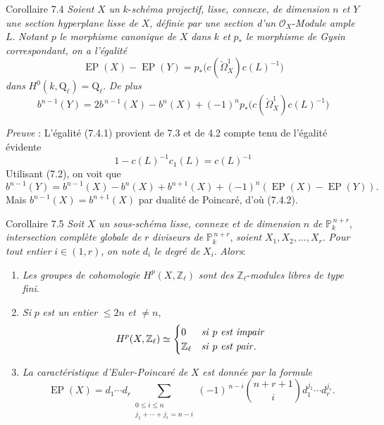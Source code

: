 \begin{statement}{Corollaire 7.4}
\emph{Soient} $X$ \emph{un} $k$-\emph{schéma projectif, lisse, connexe, de dimension} $n$ \emph{et} $Y$ \emph{une section hyperplane lisse de} $X$, \emph{définie par une section d'un} $\mathcal{O}_X$-\emph{Module ample} $L$. \emph{Notant} $p$ \emph{le morphisme canonique de} $X$ \emph{dans} $k$ \emph{et} $p_*$ \emph{le morphisme de Gysin correspondant, on a l'égalité}
\[
\operatorname{EP}(X)-\operatorname{EP}(Y)=p_*\bigl(c(\check\Omega_X^1)c(L)^{-1}\bigr)
\tag{7.4.1}
\]
\emph{dans} $H^0(k,\mathrm{Q}_\ell)=\mathrm{Q}_\ell$. \emph{De plus}
\[
b^{n-1}(Y)=2b^{\,n-1}(X)-b^n(X)+(-1)^n p_*\bigl(c(\check\Omega_X^1)c(L)^{-1}\bigr)
\tag{7.4.2}
\]
\end{statement}

\emph{Preuve} : L'égalité (7.4.1) provient de 7.3 et de 4.2 compte tenu de l'égalité évidente
\[
1-c(L)^{-1}c_1(L)=c(L)^{-1}
\]
Utilisant (7.2), on voit que
\[
b^{n-1}(Y)=b^{n-1}(X)-b^n(X)+b^{n+1}(X)+(-1)^n(\operatorname{EP}(X)-\operatorname{EP}(Y)).
\]
Mais $b^{n-1}(X)=b^{n+1}(X)$ par dualité de Poincaré, d'où (7.4.2).

\begin{statement}{Corollaire 7.5}
\emph{Soit} $X$ \emph{un sous-schéma lisse, connexe et de dimension} $n$ \emph{de} $\mathbb{P}_k^{\,n+r}$, \emph{intersection complète globale de} $r$ \emph{diviseurs de} $\mathbb{P}_k^{\,n+r}$, \emph{soient} $X_1,X_2,\ldots,X_r$. \emph{Pour tout entier} $i\in(1,r)$, \emph{on note} $d_i$ \emph{le degré de} $X_i$. \emph{Alors}:
\begin{enumerate}[label=(\roman*)]
\item \emph{Les groupes de cohomologie} $H^p(X,\mathbb{Z}_\ell)$ \emph{sont des} $\mathbb{Z}_\ell$-\emph{modules libres de type fini}.
\item \emph{Si} $p$ \emph{est un entier} $\le 2n$ \emph{et} $\ne n$,
\[
H^p(X,\mathbb{Z}_\ell)\simeq
\begin{cases}
0&\text{\emph{si} }p\text{ \emph{est impair}}\\
\mathbb{Z}_\ell&\text{\emph{si} }p\text{ \emph{est pair}}.
\end{cases}
\]
\item \emph{La caractéristique d'Euler-Poincaré de} $X$ \emph{est donnée par la formule}
\[
\operatorname{EP}(X)
=d_1\cdots d_r
\sum_{\substack{0\le i\le n\\ j_1+\cdots+j_r=n-i}}
(-1)^{\,n-i}\binom{n+r+1}{i}
d_1^{j_1}\cdots d_r^{j_r}.
\]
\end{enumerate}
\end{statement}

